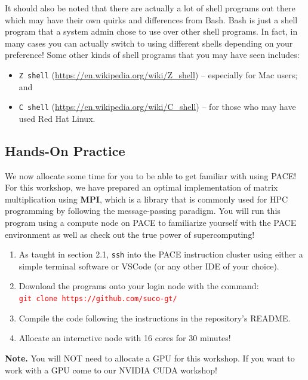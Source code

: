 \documentclass{article}
\begin{document}
\noindent It should also be noted that there are actually a lot of shell programs out there which may have their own quirks and differences from Bash. Bash is just a shell program that a system admin chose to use over other shell programs. In fact, in many cases you can actually switch to using different shells depending on your preference! Some other kinds of shell programs that you may have seen includes:

\begin{itemize}
    \item \texttt{Z shell} (\url{https://en.wikipedia.org/wiki/Z_shell}) -- especially for Mac users; and
    \item \texttt{C shell} (\url{https://en.wikipedia.org/wiki/C_shell}) -- for those who may have used Red Hat Linux.
\end{itemize}

\subsection{Hands-On Practice}

We now allocate some time for you to be able to get familiar with using PACE! For this workshop, we have prepared an optimal implementation of matrix multiplication using \textbf{MPI}, which is a library that is commonly used for HPC programming by following the message-passing paradigm. You will run this program using a compute node on PACE to familiarize yourself with the PACE environment as well as check out the true power of supercomputing!

\begin{enumerate}
    \item As taught in section 2.1, \texttt{ssh} into the PACE instruction cluster using either a simple terminal software or VSCode (or any other IDE of your choice).
    \item Download the programs onto your login node with the command: \\ \textcolor{red}{\texttt{git clone https://github.com/suco-gt/}}
    \item Compile the code following the instructions in the repository's README. 
    \item Allocate an interactive node with 16 cores for 30 minutes!
\end{enumerate}

\noindent \textbf{Note.} You will NOT need to allocate a GPU for this workshop. If you want to work with a GPU come to our NVIDIA CUDA workshop!
\end{document}

